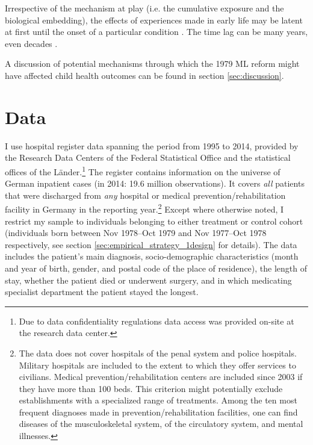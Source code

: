 \documentclass[11pt, a4paper, draft]{article} %
\begin{document}
Irrespective of the mechanism at play (i.e. the cumulative exposure and the biological embedding), the effects of experiences made in early life may be latent at first until the onset of a particular condition \citep{almond2011fetalorigins}. The time lag can be many years, even decades \citep{shonkoff2009neuroscience}.

A discussion of potential mechanisms through which the 1979 ML reform might have affected child health outcomes can be found in section \ref{sec:discussion}.













\bigskip
\section{Data}\label{sec:data} 
I use hospital register data spanning the period from 1995 to 2014, provided by the Research Data Centers of the Federal Statistical Office and the statistical offices of the Länder.\footnote{Due to data confidentiality regulations data access was provided on-site at the research data center.} The register contains information on the universe of German inpatient cases (in 2014: 19.6 million observations). It covers \textit{all} patients that were discharged from \textit{any} hospital or medical prevention/rehabilitation facility in Germany in the reporting year.\footnote{The data does not cover hospitals of the penal system and police hospitals. Military hospitals are included to the extent to which they offer services to civilians. Medical prevention/rehabilitation centers are included since 2003 if they have more than 100 beds. This criterion might potentially exclude establishments with a specialized range of treatments. Among the ten most frequent diagnoses made in prevention/rehabilitation facilities, one can find diseases of the musculoskeletal system, of the circulatory system, and mental illnesses.} Except where otherwise noted, I restrict my sample to individuals belonging to either treatment or control cohort (individuals born between Nov 1978--Oct 1979 and Nov 1977--Oct 1978 respectively, see section \ref{sec:empirical_strategy_1design} for details). The data includes the patient's main diagnosis, socio-demographic characteristics (month and year of birth, gender, and postal code of the place of residence), the length of stay, whether the patient died or underwent surgery, and in which medicating specialist department the patient stayed the longest.
\end{document}
